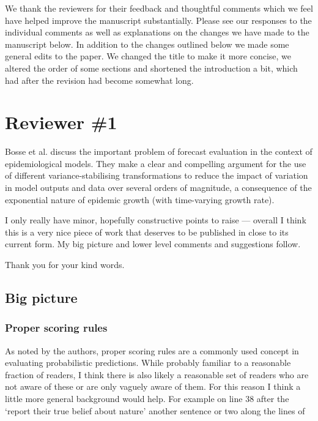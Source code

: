 \documentclass{article}
\newcommand{\red}{\color{red}}
\newcommand{\black}{\color{black}}
\newcommand{\blue}{\color{blue}}
\begin{document}


\black
We thank the reviewers for their feedback and thoughtful comments which we feel have helped improve the manuscript substantially. Please see our responses to the individual comments as well as explanations on the changes we have made to the manuscript below. 
In addition to the changes outlined below we made some general edits to the paper. We changed the title to make it more concise, we altered the order of some sections and shortened the introduction a bit, which had after the revision had become somewhat long. 


\section{Reviewer \#1}

\blue
Bosse et al. discuss the important problem of forecast evaluation in the context of epidemiological models. They make a clear and compelling argument for the use of different variance-stabilising transformations to reduce the impact of variation in model outputs and data over several orders of magnitude, a consequence of the exponential nature of epidemic growth (with time-varying growth rate).

I only really have minor, hopefully constructive points to raise — overall I think this is a very nice piece of work that deserves to be published in close to its current form. My big picture and lower level comments and suggestions follow.

\black
Thank you for your kind words.

\blue
\subsection{Big picture}
\subsubsection{Proper scoring rules}
As noted by the authors, proper scoring rules are a commonly used concept in evaluating probabilistic predictions. While probably familiar to a reasonable fraction of readers, I think there is also likely a reasonable set of readers who are not aware of these or are only vaguely aware of them. For this reason I think a little more general background would help. For example on line 38 after the ‘report their true belief about nature’ another sentence or two along the lines of
\end{document}
